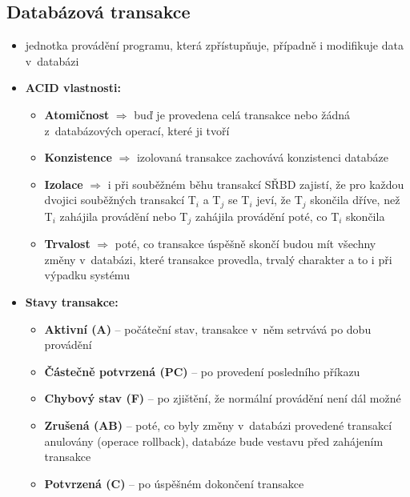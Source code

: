 \documentclass[a4paper,10pt]{article}
\newcommand{\pojem}[2]{\item \textbf{#1:}\quad #2}
\begin{document}
		\subsection{Databázová transakce}
			\begin{itemize}
				\item jednotka provádění programu, která zpřístupňuje, případně i modifikuje data v~databázi

				\pojem{ACID vlastnosti}
				\begin{itemize}
					\item \textbf{Atomičnost} $\Rightarrow$ buď je provedena celá transakce nebo žádná z~databázových operací, které ji tvoří
					\item \textbf{Konzistence} $\Rightarrow$ izolovaná transakce zachovává konzistenci databáze
					\item \textbf{Izolace} $\Rightarrow$ i při souběžném běhu transakcí SŘBD zajistí, že pro každou dvojici souběžných transakcí T$_i$ a T$_j$ se T$_i$ jeví, že T$_j$ skončila dříve, než T$_i$ zahájila provádění nebo T$_j$ zahájila provádění poté, co T$_i$ skončila
					\item \textbf{Trvalost} $\Rightarrow$ poté, co transakce úspěšně skončí budou mít všechny změny v~databázi, které transakce provedla, trvalý charakter a to i při výpadku systému
				\end{itemize}
				\pagebreak

				\pojem{Stavy transakce}
				\begin{figure}[h!]
					\centering
				\end{figure}
				
				\begin{itemize}
					\item \textbf{Aktivní (A)} -- počáteční stav, transakce v~něm setrvává po dobu provádění
					\item \textbf{Částečně potvrzená (PC)} -- po provedení posledního příkazu
					\item \textbf{Chybový stav (F)} -- po zjištění, že normální provádění není dál možné
					\item \textbf{Zrušená (AB)} -- poté, co byly změny v~databázi provedené transakcí anulovány (operace rollback), databáze bude vestavu před zahájením transakce
					\item \textbf{Potvrzená (C)} -- po úspěšném dokončení transakce
				\end{itemize}
			\end{itemize}
\end{document}
